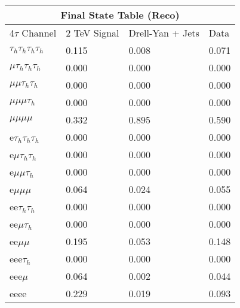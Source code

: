 \documentclass{article}
\begin{document}
 
\begin{landscape} 
\centering 
\begin{tabular}{|p{4.5cm}|p{3cm}|p{3cm}|p{3cm}|}\hline 
\multicolumn{4}{|c|}{Final State Table (Reco)} \\ 
\hline 
4$\tau$ Channel & 2 TeV Signal & Drell-Yan + Jets & Data \\ 
\hline 
$\tau_h$$\tau_h$$\tau_h$$\tau_h$ & 0.115 & 0.008 & 0.071\\
\hline 
$\mu$$\tau_h$$\tau_h$$\tau_h$ & 0.000 & 0.000 & 0.000\\
\hline 
$\mu$$\mu$$\tau_h$$\tau_h$ & 0.000 & 0.000 & 0.000\\
\hline 
$\mu$$\mu$$\mu$$\tau_h$ & 0.000 & 0.000 & 0.000\\
\hline 
$\mu$$\mu$$\mu$$\mu$ & 0.332 & 0.895 & 0.590\\
\hline 
e$\tau_h$$\tau_h$$\tau_h$ & 0.000 & 0.000 & 0.000\\
\hline 
e$\mu$$\tau_h$$\tau_h$ & 0.000 & 0.000 & 0.000\\
\hline 
e$\mu$$\mu$$\tau_h$ & 0.000 & 0.000 & 0.000\\
\hline 
e$\mu$$\mu$$\mu$ & 0.064 & 0.024 & 0.055\\
\hline 
ee$\tau_h$$\tau_h$ & 0.000 & 0.000 & 0.000\\
\hline 
ee$\mu$$\tau_h$ & 0.000 & 0.000 & 0.000\\
\hline 
ee$\mu$$\mu$ & 0.195 & 0.053 & 0.148\\
\hline 
eee$\tau_h$ & 0.000 & 0.000 & 0.000\\
\hline 
eee$\mu$ & 0.064 & 0.002 & 0.044\\
\hline 
eeee & 0.229 & 0.019 & 0.093\\
\hline 
\end{tabular} 
\end{landscape} 
\end{document}
